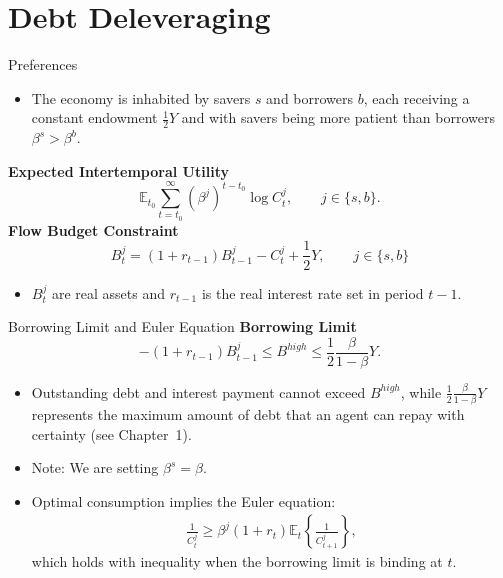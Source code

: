 \documentclass[11pt,aspectratio=169]{beamer}
\newcommand{\E}{\mathbb{E}}
\begin{document}
\section{Debt Deleveraging}

\begin{frame}{Preferences}
\small
    \begin{itemize}
        \item The economy is inhabited by savers $s$ and borrowers $b$, each receiving a constant endowment $\frac{1}{2}Y$ and with savers being more patient than borrowers $\beta^s > \beta^b$.
    \end{itemize}

\textbf{Expected Intertemporal Utility}
        \begin{equation}
            \E_{t_0}\sum_{t=t_0}^\infty (\beta^j)^{t-t_0}\log C_t^j, \qquad j\in\{s,b\}.
            \label{eq1}
        \end{equation}
\textbf{Flow Budget Constraint}
        \begin{equation}
            B_t^j = (1+r_{t-1})B_{t-1}^j - C_t^j + \frac{1}{2}Y, \qquad j\in\{s,b\}
            \label{eq2}
        \end{equation}
        
    \begin{itemize}
        \item $B_t^j$ are real assets and $r_{t-1}$ is the real interest rate set in period $t-1$.
    \end{itemize}
\end{frame}

\begin{frame}{Borrowing Limit and Euler Equation}
\small
\textbf{Borrowing Limit}
        \begin{equation}
            -(1+r_{t-1})B_{t-1}^j \le B^{high} \le \frac{1}{2}\frac{\beta}{1-\beta}Y.
        \end{equation}
    \begin{itemize}
        \item Outstanding debt and interest payment cannot exceed $B^{high}$, while $\frac{1}{2}\frac{\beta}{1-\beta}Y$ represents the maximum amount of debt that an agent can repay with certainty (see Chapter~1). 
        \item Note: We are setting $\beta^s = \beta$.
        \item Optimal consumption implies the Euler equation: 
        \begin{align}
            \frac{1}{C_t^j}\ge \beta^j(1+r_t)\E_t\!\left\{\frac{1}{C_{t+1}^j}\right\},
            \label{eq3}
        \end{align}
        which holds with inequality when the borrowing limit is binding at $t$.
    \end{itemize}
\end{frame}
\end{document}
